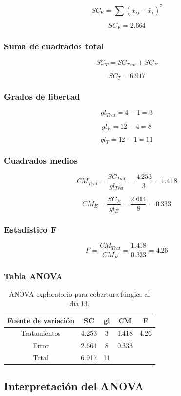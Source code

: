 \[
SC_E=\sum(x_{ij}-\bar{x}_i)^2
\]

\[
SC_E=2.664
\]

\subsubsection{Suma de cuadrados total}

\[
SC_T=SC_{Trat}+SC_E
\]

\[
SC_T=6.917
\]

\subsubsection{Grados de libertad}

\[
gl_{Trat}=4-1=3
\]

\[
gl_E=12-4=8
\]

\[
gl_T=12-1=11
\]

\subsubsection{Cuadrados medios}

\[
CM_{Trat}=\frac{SC_{Trat}}{gl_{Trat}}=\frac{4.253}{3}=1.418
\]

\[
CM_E=\frac{SC_E}{gl_E}=\frac{2.664}{8}=0.333
\]

\subsubsection{Estadístico F}

\[
F=\frac{CM_{Trat}}{CM_E}=\frac{1.418}{0.333}=4.26
\]

\subsubsection{Tabla ANOVA}

\begin{table}[H]
\centering
\begin{tabular}{ccccc}
\hline
Fuente de variación & SC & gl & CM & F \\
\hline
Tratamientos & 4.253 & 3 & 1.418 & 4.26 \\
Error & 2.664 & 8 & 0.333 & \\
Total & 6.917 & 11 & & \\
\hline
\end{tabular}
\caption{ANOVA exploratorio para cobertura fúngica al día 13.}
\end{table}

\subsection{Interpretación del ANOVA}

